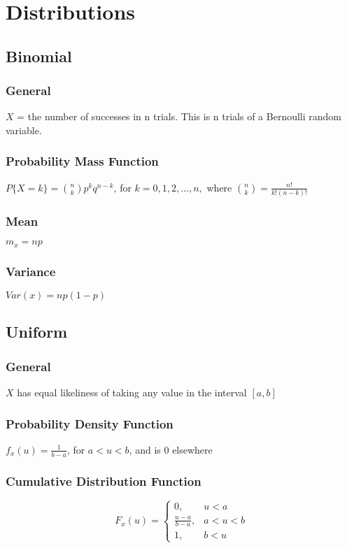 \section*{Distributions}
\subsection*{Binomial }

\subsubsection*{General}
$X$ = the number of successes in n trials.
This is n trials of a Bernoulli random variable.

\subsubsection*{Probability Mass Function}
$P\{X=k\} = \binom{n}{k}p^kq^{n-k}$, for $k=0,1,2,...,n,$ where $\binom{n}{k}=\frac{n!}{k!(n-k)!}$

\subsubsection*{Mean}
$m_x=np$

\subsubsection*{Variance}
$Var(x)=np(1-p)$
    
\subsection*{Uniform }

\subsubsection*{General}
$X$ has equal likeliness of taking any value in the interval $[a,b]$

\subsubsection*{Probability Density Function}
$f_x(u) = \frac{1}{b-a}$, for $a<u<b$, and is 0 elsewhere

\subsubsection*{Cumulative Distribution Function}
\[ F_x(u)=
  \begin{cases} 
      0,               &     u < a \\
      \frac{u-a}{b-a}, & a < u < b \\
      1,               & b < u 
   \end{cases}
\]

